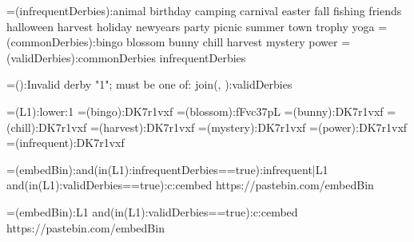 {=(infrequentDerbies):animal birthday camping carnival easter fall fishing friends halloween harvest holiday newyears party picnic summer town trophy yoga}
{=(commonDerbies):bingo blossom bunny chill harvest mystery power}
{=(validDerbies):{commonDerbies} {infrequentDerbies}}

{=():Invalid derby "{1}"; must be one of: {join(, ):{validDerbies}}}

{=(L1):{lower:{1}}}
{=(bingo):DK7r1vxf}
{=(blossom):fFvc37pL}
{=(bunny):DK7r1vxf}
{=(chill):DK7r1vxf}
{=(harvest):DK7r1vxf}
{=(mystery):DK7r1vxf}
{=(power):DK7r1vxf}
{=(infrequent):DK7r1vxf}


{=(embedBin):{{and({in({L1}):{infrequentDerbies}}==true):infrequent|{L1}}}}
{{and({in({L1}):{validDerbies}}==true):c:cembed https://pastebin.com/{embedBin}}}

{=(embedBin):{{L1}}}
{{and({in({L1}):{validDerbies}}==true):c:cembed https://pastebin.com/{embedBin}}}